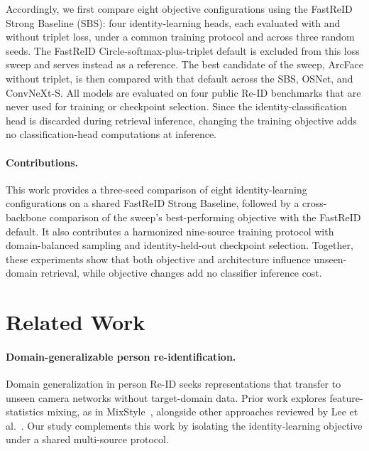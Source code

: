 \documentclass{llncs}
\begin{document}
Accordingly, we first compare eight objective configurations using the FastReID Strong Baseline (SBS): four identity-learning heads, each evaluated with and without triplet loss, under a common training protocol and across three random seeds. The FastReID Circle-softmax-plus-triplet default is excluded from this loss sweep and serves instead as a reference. The best candidate of the sweep, ArcFace without triplet, is then compared with that default across the SBS, OSNet, and ConvNeXt-S. All models are evaluated on four public Re-ID benchmarks that are never used for training or checkpoint selection. Since the identity-classification head is discarded during retrieval inference, changing the training objective adds no classification-head computations at inference.

\paragraph{Contributions.}
This work provides a three-seed comparison of eight identity-learning configurations on a shared FastReID Strong Baseline, followed by a cross-backbone comparison of the sweep's best-performing objective with the FastReID default. It also contributes a harmonized nine-source training protocol with domain-balanced sampling and identity-held-out checkpoint selection. Together, these experiments show that both objective and architecture influence unseen-domain retrieval, while objective changes add no classifier inference cost.



\section{Related Work}
\label{sec:related}

\paragraph{Domain-generalizable person re-identification.}
Domain generalization in person Re-ID seeks representations that transfer to unseen camera networks without target-domain data. Prior work explores feature-statistics mixing, as in MixStyle~\cite{zhou2021mix}, alongside other approaches reviewed by Lee et al.~\cite{lee2025domain}. Our study complements this work by isolating the identity-learning objective under a shared multi-source protocol.
\end{document}
